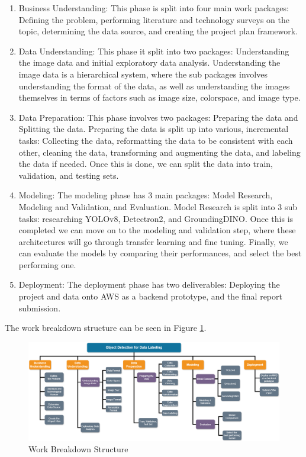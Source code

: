 \documentclass[stu,12pt,floatsintext]{apa7}
\begin{document}
\begin{enumerate}
    \item Business Understanding: This phase is split into four main work packages: Defining the problem, performing literature and technology surveys on the topic, determining the data source, and creating the project plan framework.
 
    \item Data Understanding: This phase it split into two packages: Understanding the image data and initial exploratory data analysis. Understanding the image data is a hierarchical system, where the sub packages involves understanding the format of the data, as well as understanding the images themselves in terms of factors such as image size, colorspace, and image type.
    
    \item Data Preparation: This phase involves two packages: Preparing the data and Splitting the data. Preparing the data is split up into various, incremental tasks: Collecting the data, reformatting the data to be consistent with each other, cleaning the data, transforming and augmenting the data, and labeling the data if needed. Once this is done, we can split the data into train, validation, and testing sets.
    
    \item Modeling: The modeling phase has 3 main packages: Model Research, Modeling and Validation, and Evaluation. Model Research is split into 3 sub tasks: researching YOLOv8, Detectron2, and GroundingDINO. Once this is completed we can move on to the modeling and validation step, where these architectures will go through transfer learning and fine tuning. Finally, we can evaluate the models by comparing their performances, and select the best performing one.
    
    \item Deployment: The deployment phase has two deliverables: Deploying the project and data onto AWS as a backend prototype, and the final report submission. 
\end{enumerate}

The work breakdown structure can be seen in Figure \ref{fig:wbs}.
\begin{figure}[!htb]
    \centering
    \includegraphics[width=1\linewidth]{./images/WBS_updated.png}
    \caption{Work Breakdown Structure}
    \label{fig:wbs}
\end{figure}
\end{document}

